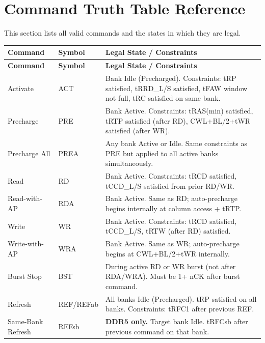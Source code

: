 \documentclass[11pt,a4paper]{article}
\begin{document}
\section{Command Truth Table Reference}

This section lists all valid commands and the states in which they are legal.

\begin{longtable}{L{2.8cm} L{1.8cm} L{9cm}}
\toprule
\textbf{Command} & \textbf{Symbol} & \textbf{Legal State / Constraints} \\
\midrule
\endfirsthead
\toprule
\textbf{Command} & \textbf{Symbol} & \textbf{Legal State / Constraints} \\
\midrule
\endhead
\bottomrule
\endfoot

Activate          & ACT   & Bank Idle (Precharged). Constraints: tRP satisfied, tRRD\_L/S satisfied, tFAW window not full, tRC satisfied on same bank. \\
Precharge         & PRE   & Bank Active. Constraints: tRAS(min) satisfied, tRTP satisfied (after RD), CWL+BL/2+tWR satisfied (after WR). \\

Precharge All     & PREA  & Any bank Active or Idle. Same constraints as PRE but applied to all active banks simultaneously. \\
Read              & RD    & Bank Active. Constraints: tRCD satisfied, tCCD\_L/S satisfied from prior RD/WR. \\

Read-with-AP      & RDA   & Bank Active. Same as RD; auto-precharge begins internally at column access + tRTP. \\
Write             & WR    & Bank Active. Constraints: tRCD satisfied, tCCD\_L/S, tRTW (after RD) satisfied. \\

Write-with-AP     & WRA   & Bank Active. Same as WR; auto-precharge begins at CWL+BL/2+tWR internally. \\
Burst Stop        & BST   & During active RD or WR burst (not after RDA/WRA). Must be 1+ nCK after burst command. \\

Refresh           & REF/REFab & All banks Idle (Precharged). tRP satisfied on all banks. Constraints: tRFC1 after previous REF. \\
Same-Bank Refresh & REFsb & \textbf{DDR5 only.} Target bank Idle. tRFCsb after previous command on that bank. \\


\end{longtable}
\end{document}
